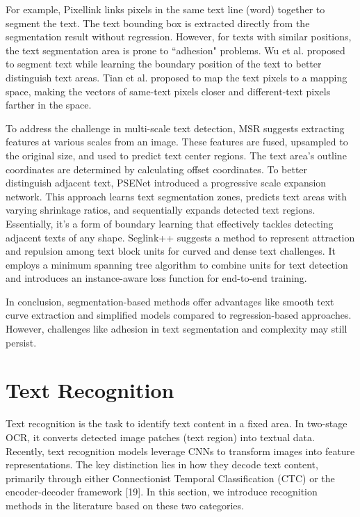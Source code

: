 \documentclass[12pt,twoside]{report}
\begin{document}
For example, Pixellink \cite{deng2018pixellink} links pixels in the same text line (word) together to segment the text. The text bounding box is extracted directly from the segmentation result without regression. However, for texts with similar positions, the text segmentation area is prone to ``adhesion" problems. Wu et al. \cite{wu2017self} proposed to segment text while learning the boundary position of the text to better distinguish text areas. Tian et al. \cite{tian2019learning} proposed to map the text pixels to a mapping space, making the vectors of same-text pixels closer and different-text pixels farther in the space.

To address the challenge in multi-scale text detection, MSR \cite{xue2019msr} suggests extracting features at various scales from an image. These features are fused, upsampled to the original size, and used to predict text center regions. The text area's outline coordinates are determined by calculating offset coordinates. To better distinguish adjacent text, PSENet \cite{li2020psenet} introduced a progressive scale expansion network. This approach learns text segmentation zones, predicts text areas with varying shrinkage ratios, and sequentially expands detected text regions. Essentially, it's a form of boundary learning that effectively tackles detecting adjacent texts of any shape. Seglink++ \cite{tang2019seglink++} suggests a method to represent attraction and repulsion among text block units for curved and dense text challenges. It employs a minimum spanning tree algorithm to combine units for text detection and introduces an instance-aware loss function for end-to-end training.

In conclusion, segmentation-based methods offer advantages like smooth text curve extraction and simplified models compared to regression-based approaches. However, challenges like adhesion in text segmentation and complexity may still persist.

\section{Text Recognition}
Text recognition is the task to identify text content in a fixed area. In two-stage OCR, it converts detected image patches (text region) into textual data. Recently, text recognition models leverage CNNs to transform images into feature representations. The key distinction lies in how they decode text content, primarily through either Connectionist Temporal Classification (CTC) \cite{graves2006ctc} or the encoder-decoder framework [19]. In this section, we introduce recognition methods in the literature based on these two categories.
\end{document}
